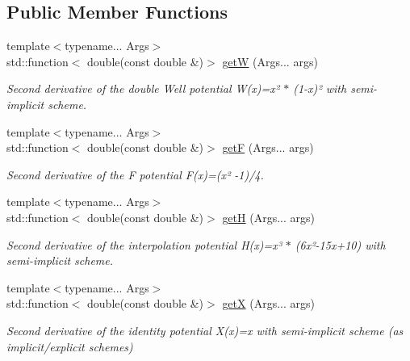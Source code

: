 \subsection*{Public Member Functions}
\begin{DoxyCompactItemize}
\item 
{\footnotesize template$<$typename... Args$>$ }\\std\+::function$<$ double(const double \&)$>$ \hyperlink{structpotential__function_3_012_00_01ThermodynamicsPotentialDiscretization_1_1SemiImplicit_01_4_a80077a6db9f6c510c4c348e8d17b66af}{getW} (Args... args)
\begin{DoxyCompactList}\small\item\em Second derivative of the double Well potential W(x)=x² $\ast$ (1-\/x)² with semi-\/implicit scheme. \end{DoxyCompactList}\item 
{\footnotesize template$<$typename... Args$>$ }\\std\+::function$<$ double(const double \&)$>$ \hyperlink{structpotential__function_3_012_00_01ThermodynamicsPotentialDiscretization_1_1SemiImplicit_01_4_a7c0c2eac8efd3a84e6263ab4a3125b4b}{getF} (Args... args)
\begin{DoxyCompactList}\small\item\em Second derivative of the F potential F(x)=(x² -\/1)/4. \end{DoxyCompactList}\item 
{\footnotesize template$<$typename... Args$>$ }\\std\+::function$<$ double(const double \&)$>$ \hyperlink{structpotential__function_3_012_00_01ThermodynamicsPotentialDiscretization_1_1SemiImplicit_01_4_a0443acadfdca63ee670104434d74ae80}{getH} (Args... args)
\begin{DoxyCompactList}\small\item\em Second derivative of the interpolation potential H(x)=x³ $\ast$ (6x²-\/15x+10) with semi-\/implicit scheme. \end{DoxyCompactList}\item 
{\footnotesize template$<$typename... Args$>$ }\\std\+::function$<$ double(const double \&)$>$ \hyperlink{structpotential__function_3_012_00_01ThermodynamicsPotentialDiscretization_1_1SemiImplicit_01_4_ac71f890ab727626f62d1cb0aa73052f8}{getX} (Args... args)
\begin{DoxyCompactList}\small\item\em Second derivative of the identity potential X(x)=x with semi-\/implicit scheme (as implicit/explicit schemes) \end{DoxyCompactList}\end{DoxyCompactItemize}


